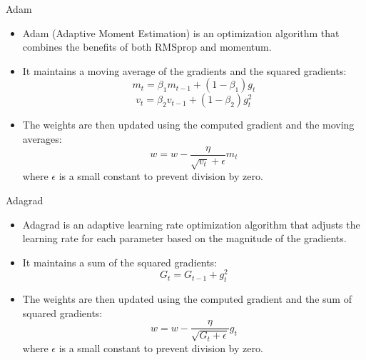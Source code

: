\begin{frame}{}{Adam}
    \begin{itemize}
        \item Adam (Adaptive Moment Estimation) is an optimization algorithm that combines the benefits of both RMSprop and momentum.
        \item It maintains a moving average of the gradients and the squared gradients:
              \[
                  m_t = \beta_1 m_{t-1} + (1 - \beta_1) g_t
              \]
              \[
                  v_t = \beta_2 v_{t-1} + (1 - \beta_2) g_t^2
              \]
        \item The weights are then updated using the computed gradient and the moving averages:
              \[
                  w = w - \frac{\eta}{\sqrt{v_t} + \epsilon} m_t
              \]
              where $\epsilon$ is a small constant to prevent division by zero.
    \end{itemize}
\end{frame}

\begin{frame}{}{Adagrad}
    \begin{itemize}
        \item Adagrad is an adaptive learning rate optimization algorithm that adjusts the learning rate for each parameter based on the magnitude of the gradients.
        \item It maintains a sum of the squared gradients:
              \[
                  G_t = G_{t-1} + g_t^2
              \]
        \item The weights are then updated using the computed gradient and the sum of squared gradients:
              \[
                  w = w - \frac{\eta}{\sqrt{G_t + \epsilon}} g_t
              \]
              where $\epsilon$ is a small constant to prevent division by zero.
    \end{itemize}
\end{frame}

